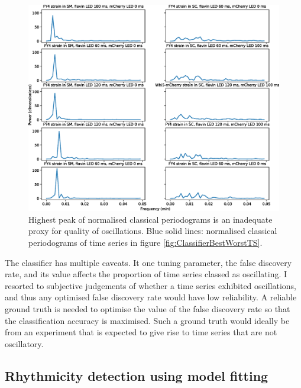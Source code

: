 \begin{figure}[htbp]
  \centering
  \includegraphics[width=\textwidth]{10m_ClassifierBestWorstPS}
  \caption{
    Highest peak of normalised classical periodograms is an inadequate proxy for quality of oscillations.
    Blue solid lines: normalised classical periodograms of time series in figure \ref{fig:ClassifierBestWorstTS}.
  }
  \label{fig:ClassifierBestWorstPS}
\end{figure}

The classifier has multiple caveats.
It one tuning parameter, the false discovery rate, and its value affects the proportion of time series classed as oscillating.
I resorted to subjective judgements of whether a time series exhibited oscillations, and thus any optimised false discovery rate would have low reliability.
A reliable ground truth is needed to optimise the value of the false discovery rate so that the classification accuracy is maximised.
Such a ground truth would ideally be from an experiment that is expected to give rise to time series that are not oscillatory.

\subsection{Rhythmicity detection using model fitting}
\label{subsec:analysis-classification-ar}

